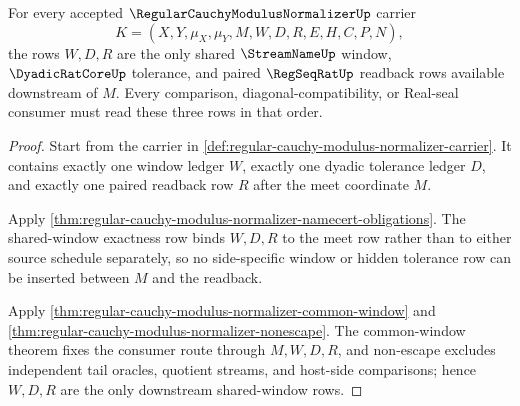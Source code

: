 \begin{theorem}
\label{thm:regular-cauchy-modulus-normalizer-shared-window-obligation}
For every accepted $\RegularCauchyModulusNormalizerUp$ carrier
$$
K=(X,Y,\mu_X,\mu_Y,M,W,D,R,E,H,C,P,N),
$$
the rows $W,D,R$ are the only shared $\StreamNameUp$ window, $\DyadicRatCoreUp$ tolerance, and paired $\RegSeqRatUp$ readback rows available downstream of $M$. Every comparison, diagonal-compatibility, or Real-seal consumer must read these three rows in that order.
\end{theorem}
\begin{proof}
Start from the carrier in \autoref{def:regular-cauchy-modulus-normalizer-carrier}. It contains exactly one window ledger $W$, exactly one dyadic tolerance ledger $D$, and exactly one paired readback row $R$ after the meet coordinate $M$.

Apply \autoref{thm:regular-cauchy-modulus-normalizer-namecert-obligations}. The shared-window exactness row binds $W,D,R$ to the meet row rather than to either source schedule separately, so no side-specific window or hidden tolerance row can be inserted between $M$ and the readback.

Apply \autoref{thm:regular-cauchy-modulus-normalizer-common-window} and \autoref{thm:regular-cauchy-modulus-normalizer-nonescape}. The common-window theorem fixes the consumer route through $M,W,D,R$, and non-escape excludes independent tail oracles, quotient streams, and host-side comparisons; hence $W,D,R$ are the only downstream shared-window rows.
\end{proof}

